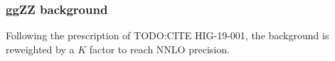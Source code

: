 \subsubsection{ggZZ background}
Following the prescription of TODO:CITE HIG-19-001,
the \ggzzfourl background 
is reweighted by a $K$ factor to reach NNLO precision.

